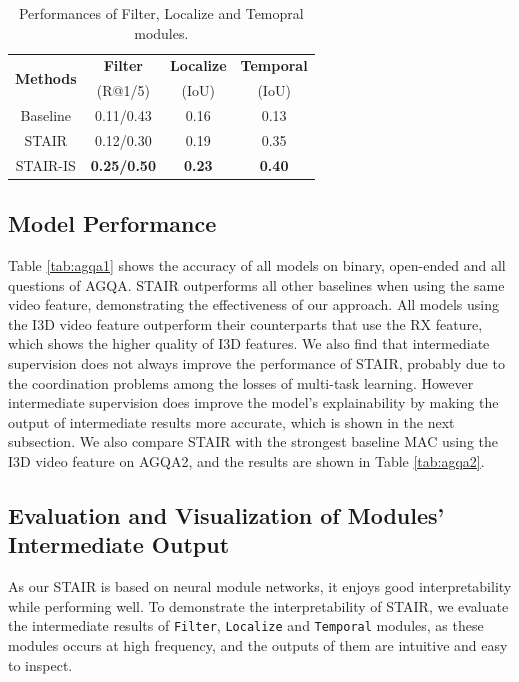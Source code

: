 \documentclass[letterpaper]{article} %
\begin{document}
\begin{table}[t]
    \centering
    \setlength{\abovecaptionskip}{5pt}
    \setlength{\tabcolsep}{4pt}
    \begin{tabular}{c|ccc}
    \hline
    \multirow{2}{*}{\textbf{Methods}} & \textbf{Filter} & \textbf{Localize} & \textbf{Temporal} \\
     & (R@1/5) & (IoU) & (IoU) \\
    \hline
    Baseline & 0.11/0.43 & 0.16 & 0.13 \\
    STAIR & 0.12/0.30 & 0.19 & 0.35 \\
    STAIR-IS & \textbf{0.25/0.50} & \textbf{0.23} & \textbf{0.40} \\
    \hline
    \end{tabular}
    \caption{Performances of Filter, Localize and Temopral modules.}
    \label{tab:interpret}
\end{table}

\subsection{Model Performance}
Table \ref{tab:agqa1} shows the accuracy of all models on binary, open-ended and all questions of AGQA. STAIR outperforms all other baselines when using the same video feature, demonstrating the effectiveness of our approach. All models using the I3D video feature outperform their counterparts that use the RX feature, which shows the higher quality of I3D features. We also find that intermediate supervision does not always improve the performance of STAIR, probably due to the coordination problems among the losses of multi-task learning. However intermediate supervision does improve the model's explainability by making the output of intermediate results more accurate, which is shown in the next subsection. We also compare STAIR with the strongest baseline MAC using the I3D video feature on AGQA2, and the results are shown in Table \ref{tab:agqa2}.

\subsection{Evaluation and Visualization of Modules' Intermediate Output}
As our STAIR is based on neural module networks, it enjoys good interpretability while performing well.
To demonstrate the interpretability of STAIR, we evaluate the intermediate results of \texttt{Filter}, \texttt{Localize} and \texttt{Temporal} modules, as these modules occurs at high frequency, and the outputs of them are intuitive and easy to inspect.
\end{document}
